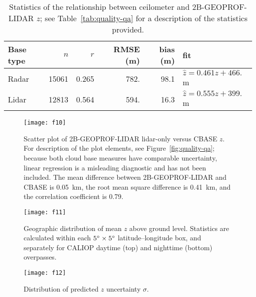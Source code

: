 \documentclass[essd,manuscript]{copernicus}
\begin{document}
\begin{table*}
  \caption{Statistics of the relationship between ceilometer and
    2B-GEOPROF-LIDAR \ensuremath{z}{}; see Table~\ref{tab:quality-qa} for a
    description of the statistics provided.}
  \label{tab:2bgeoprof}
  \centering
\begin{tabular}{lrrrrl}
  \hline
\hline
Base type & $n$ & $r$ & RMSE (m) & bias (m) & fit \\ 
  \hline
Radar & 15061 & 0.265 & 782. & 98.1 & $\hat{z} = 0.461 z + 466.$ m \\ 
  Lidar & 12813 & 0.564 & 594. & 16.3 & $\hat{z} = 0.555 z + 399.$ m \\ 
   \hline
\hline
\end{tabular}

\end{table*}

\begin{figure*}
{\centering \texttt{[image: f10]}

}
  \caption{Scatter plot of 2B-GEOPROF-LIDAR lidar-only versus CBASE \ensuremath{z}{}.  For
    description of the plot elements, see Figure~\ref{fig:quality-qa}; because
    both cloud base measures have comparable uncertainty, linear regression is a
    misleading diagnostic \citep{Pitkanen2016} and has not been included.  The mean
    difference between 2B-GEOPROF-LIDAR and CBASE is 0.05~\unit{km},
    the root mean square difference is 0.41~\unit{km}, and the
    correlation coefficient is 0.79.}
  \label{fig:comp-2b-cbase}
\end{figure*}



\begin{figure*}
{\centering \texttt{[image: f11]}

}
  \caption{Geographic distribution of mean \ensuremath{z}{} above ground
    level.  Statistics are calculated within each $5^{\circ}\times 5^{\circ}$
    latitude--longitude box, and separately for CALIOP daytime (top) and
  nighttime (bottom)
    overpasses.}
  \label{fig:geo}
\end{figure*}

\begin{figure}
{\centering \texttt{[image: f12]}

}
  \caption{Distribution of predicted \ensuremath{z}{} uncertainty $\sigma$.}
  \label{fig:uncertainty}
\end{figure}
\end{document}
